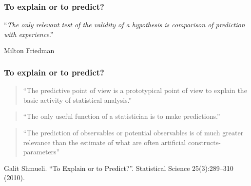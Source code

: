 \begin{frame}
\frametitle{To explain or to predict?}
\begin{center}
{\huge ``\emph{The only relevant test of the validity of a hypothesis is comparison of prediction with experience}.''\par}
\vspace{1cm}
Milton Friedman
\end{center}
\end{frame}

\begin{frame}
\frametitle{To explain or to predict?}

\begin{quote}
``The predictive point of view is a prototypical point of view to explain the basic activity of statistical analysis.''
\par {}
\end{quote}

\begin{quote}
``The only useful function of a statistician is to make predictions.''
\par {}
\end{quote}

\begin{quote}
``The prediction of observables or potential observables is of much greater relevance than the estimate of what are often artificial constructs-parameters''
\par{}
\end{quote}
\vspace{.25cm}
\begin{center}
\begin{tiny}
Galit Shmueli. ``To Explain or to Predict?''. Statistical Science 25(3):289--310 (2010).
\end{tiny}
\end{center}
\end{frame}


